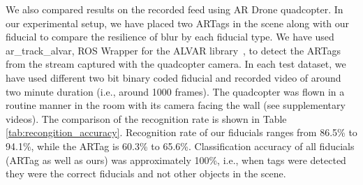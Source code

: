 \documentclass[10pt,twocolumn,letterpaper]{article}
\begin{document}
We also compared results on the recorded feed using AR Drone quadcopter. In our
experimental setup, we have placed two ARTags in the scene along with our fiducial  to
compare the resilience of blur by each fiducial type. We have used
ar\_track\_alvar, ROS Wrapper for the ALVAR library~\cite{ros_alvar}, to detect
the ARTags from the stream captured with the quadcopter camera. In each test
dataset, we have used different two bit binary coded fiducial and recorded
video of around two minute duration (i.e., around 1000 frames).   The
quadcopter was flown in a routine manner in the room with its camera facing the
wall (see supplementary videos). The comparison of the recognition rate is
shown in Table \ref{tab:recongition_accuracy}. Recognition rate of our
fiducials ranges from 86.5\% to 94.1\%, while the ARTag is 60.3\% to 65.6\%.
Classification accuracy of all fiducials (ARTag as well as ours) was
approximately 100\%, i.e., when tags were detected they were the correct
fiducials and not other objects in the scene.
\end{document}
